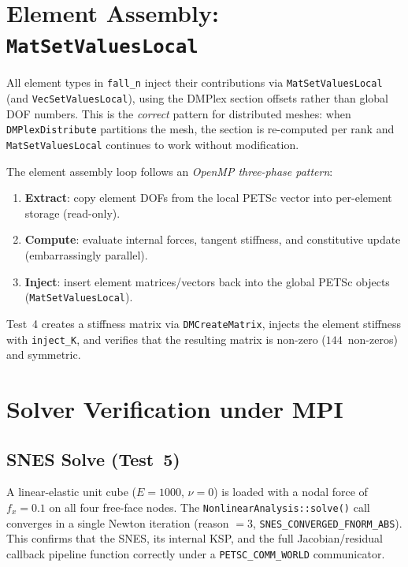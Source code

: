 \section{Element Assembly: \texttt{MatSetValuesLocal}}
\label{sec:phase6-assembly}

All element types in \texttt{fall\_n} inject their contributions via
\texttt{MatSetValuesLocal} (and \texttt{VecSetValuesLocal}), using the
DMPlex section offsets rather than global DOF numbers.  This is the
\emph{correct} pattern for distributed meshes: when
\texttt{DMPlexDistribute} partitions the mesh, the section is
re-computed per rank and \texttt{MatSetValuesLocal} continues to
work without modification.

The element assembly loop follows an \emph{OpenMP three-phase pattern}:
\begin{enumerate}
  \item \textbf{Extract}: copy element DOFs from the local PETSc vector
        into per-element storage (read-only).
  \item \textbf{Compute}: evaluate internal forces, tangent stiffness,
        and constitutive update (embarrassingly parallel).
  \item \textbf{Inject}: insert element matrices/vectors back into the
        global PETSc objects (\texttt{MatSetValuesLocal}).
\end{enumerate}

Test~4 creates a stiffness matrix via \texttt{DMCreateMatrix},
injects the element stiffness with \texttt{inject\_K}, and verifies
that the resulting matrix is non-zero ($144$~non-zeros) and symmetric.


\section{Solver Verification under MPI}
\label{sec:phase6-solvers}

\subsection{SNES Solve (Test~5)}

A linear-elastic unit cube ($E=1000$, $\nu=0$) is loaded with a
nodal force of $f_x=0.1$ on all four free-face nodes.
The \texttt{NonlinearAnalysis::solve()} call converges in a single
Newton iteration (reason $=3$, \texttt{SNES\_CONVERGED\_FNORM\_ABS}).
This confirms that the SNES, its internal KSP, and the full
Jacobian/residual callback pipeline function correctly under a
\texttt{PETSC\_COMM\_WORLD} communicator.

